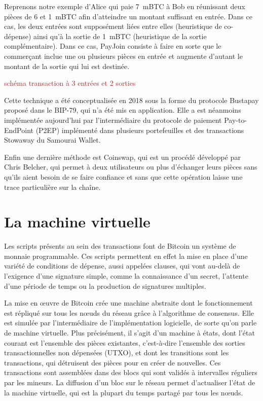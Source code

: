 Reprenons notre exemple d'Alice qui paie 7~mBTC à Bob en réunissant deux pièces de 6 et 1~mBTC afin d'atteindre un montant suffisant en entrée. Dans ce cas, les deux entrées sont supposément liées entre elles (heuristique de co-dépense) ainsi qu'à la sortie de 1~mBTC (heuristique de la sortie complémentaire). Dans ce cas, PayJoin consiste à faire en sorte que le commerçant inclue une ou plusieurs pièces en entrée et augmente d'autant le montant de la sortie qui lui est destinée.

\textcolor{brown}{schéma transaction à 3 entrées et 2 sorties}

Cette technique a été conceptualisée en 2018 sous la forme du protocole Bustapay proposé dans le BIP-79, qui n'a été mis en application. Elle a est néanmoins implémentée aujourd'hui par l'intermédiaire du protocole de paiement Pay-to-EndPoint (P2EP) implémenté dans plusieurs portefeuilles et des transactions Stowaway du Samourai Wallet.

Enfin une dernière méthode est Coinswap, qui est un procédé développé par Chris Belcher, qui permet à deux utilisateurs ou plus d'échanger leurs pièces sans qu'ils aient besoin de se faire confiance et sans que cette opération laisse une trace particulière sur la chaîne.

\section*{La machine virtuelle}

Les scripts présents au sein des transactions font de Bitcoin un système de monnaie programmable. Ces scripts permettent en effet la mise en place d'une variété de conditions de dépense, aussi appelées clauses, qui vont au-delà de l'exigence d'une signature simple, comme la connaissance d'un secret, l'attente d'une période de temps ou la production de signatures multiples.

La mise en œuvre de Bitcoin crée une machine abstraite dont le fonctionnement est répliqué sur tous les nœuds du réseau grâce à l'algorithme de consensus. Elle est simulée par l'intermédiaire de l'implémentation logicielle, de sorte qu'on parle de machine virtuelle. Plus précisément, il s'agit d'un machine à états, dont l'état courant est l'ensemble des pièces existantes, c'est-à-dire l'ensemble des sorties transactionnelles non dépensées (UTXO), et dont les transitions sont les transactions, qui détruisent des pièces pour en créer de nouvelles. Ces transactions sont assemblées dans des blocs qui sont validés à intervalles réguliers par les mineurs. La diffusion d'un bloc sur le réseau permet d'actualiser l'état de la machine virtuelle, qui est la plupart du temps partagé par tous les nœuds.

